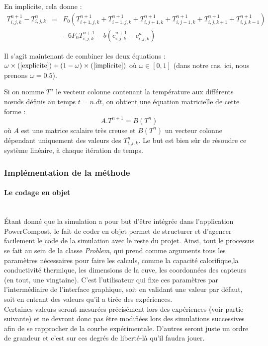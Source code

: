 \documentclass[../PS6_RapportFinal.tex]{subfiles}
\begin{document}
En implicite, cela donne :
\begin{eqnarray}
\label{implicite}
T^{n+1}_{i,j,k} - T^{n}_{i,j,k} & = & F_{0} (T^{n+1}_{i+1,j,k} + T^{n+1}_{i-1,j,k} + T^{n+1}_{i,j+1,k} + T^{n+1}_{i,j-1,k} + T^{n+1}_{i,j,k+1} + T^{n+1}_{i,j,k-1})\nonumber \\
& & - 6F_{0} T^{n+1}_{i,j,k} - b (c^{n+1}_{i,j,k} - c^{n}_{i,j,k})
\end{eqnarray}

Il s'agit maintenant de combiner les deux équations : $ \omega \times (\ref{explicite}) + (1 - \omega ) \times (\ref{implicite})$ où $ \omega \in [0,1]$ (dans notre cas, ici, nous prenons $\omega = \num{0.5}$).

Si on nomme $T^{n}$ le vecteur colonne contenant la température aux différents nœuds définis au temps $t = n.dt$, on obtient une équation matricielle de cette forme :
\begin{equation}
\label{eqMatricielle}
A.T^{n+1} = B(T^{n})
\end{equation}
où $A$ est une matrice scalaire très creuse et $B(T^{n})$ un vecteur colonne dépendant uniquement des valeurs des $T^{n}_{i,j,k}$. Le but est bien sûr de résoudre ce système linéaire, à chaque itération de temps.

\subsubsection{Implémentation de la méthode}

\paragraph{Le codage en objet} 
~\\
\indent Étant donné que la simulation a pour but d'être intégrée dans l'application PowerCompost, le fait de coder en objet permet de structurer et d'agencer facilement le code de la simulation avec le reste du projet. Ainsi, tout le processus se fait au sein de la classe \textsl{Problem}, qui prend comme arguments tous les paramètres nécessaires pour faire les calculs, comme la capacité calorifique,la conductivité thermique, les dimensions de la cuve, les coordonnées des capteurs (en tout, une vingtaine). C'est l'utilisateur qui fixe ces paramètres par l'intermédiaire de l'interface graphique, soit en validant une valeur par défaut, soit en entrant des valeurs qu'il a tirée des expériences.
~\\
\indent Certaines valeurs seront mesurées précisément lors des expériences (voir partie suivante) et ne devront donc pas être modifiées lors des simulations successives afin de se rapprocher de la courbe expérimentale. D'autres seront juste un ordre de grandeur et c'est sur ces degrés de liberté-là qu'il faudra jouer.
\end{document}

